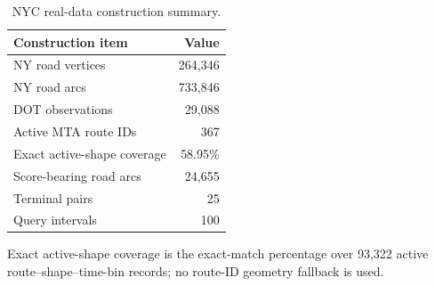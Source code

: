 \begin{table}[t]
\centering
\caption{NYC real-data construction summary.}
\label{tab:nyc-data-construction}
\begin{tabular}{lr}
\toprule
Construction item & Value \\
\midrule
NY road vertices & 264,346 \\
NY road arcs & 733,846 \\
DOT observations & 29,088 \\
Active MTA route IDs & 367 \\
Exact active-shape coverage & 58.95\% \\
Score-bearing road arcs & 24,655 \\
Terminal pairs & 25 \\
Query intervals & 100 \\
\bottomrule
\end{tabular}
\begin{minipage}{0.92\linewidth}
\footnotesize Exact active-shape coverage is the exact-match percentage over 93,322 active route--shape--time-bin records; no route-ID geometry fallback is used.
\end{minipage}
\end{table}
